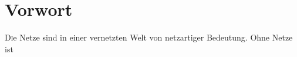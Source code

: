 \chapter*{Vorwort}
\label{chapter_vorwort}
\thispagestyle{empty}

\renewcommand{\LettrineFontHook}{\fontfamily{ppl}\fontseries{bx}}
\lettrine[lines=2]{D}ie Netze sind in einer vernetzten Welt von netzartiger
Bedeutung. Ohne Netze ist 


